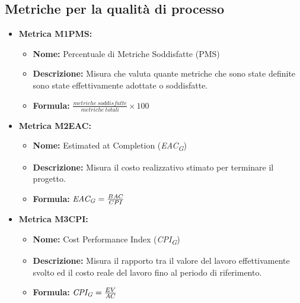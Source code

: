\subsection{Metriche per la qualità di processo}
\begin{itemize}
    \item \hypertarget{item:M1PMS}{\textbf{Metrica M1PMS:}}
    \begin{minipage}[t]{0.9\textwidth}
           \begin{itemize}
            \item \textbf{Nome:} Percentuale di Metriche Soddisfatte (PMS)
            \item \textbf{Descrizione:} Misura che valuta quante metriche che sono state definite sono state effettivamente adottate o soddisfatte. 
            \item \textbf{Formula:} $\frac{metriche \ soddisfatte}{metriche \ totali}\times 100$
           \end{itemize}
        \end{minipage}

    \item \hypertarget{item:M2EAC}{\textbf{Metrica M2EAC:}}
     \begin{minipage}[t]{0.9\textwidth}
          \begin{itemize}
              \item \textbf{Nome:} Estimated at Completion (\textit{EAC}\textsubscript{\textit{G}})
              \item \textbf{Descrizione:} Misura il costo realizzativo stimato per terminare il progetto. 
              \item \textbf{Formula:} $\textit{EAC}\textsubscript{\textit{G}} = \frac{BAC}{CPI}$
          \end{itemize}
        \end{minipage}

    \item \hypertarget{item:M3CPI}{\textbf{Metrica M3CPI:}}
    \begin{minipage}[t]{0.9\textwidth}
          \begin{itemize}
              \item \textbf{Nome:} Cost Performance Index (\textit{CPI}\textsubscript{\textit{G}})
              \item \textbf{Descrizione:} Misura il rapporto tra il valore del lavoro effettivamente svolto ed il costo reale del lavoro fino al periodo di riferimento. 
              \item \textbf{Formula:} $\textit{CPI}\textsubscript{\textit{G}} = \frac{EV}{AC}$
          \end{itemize}
        \end{minipage}


\end{itemize}
